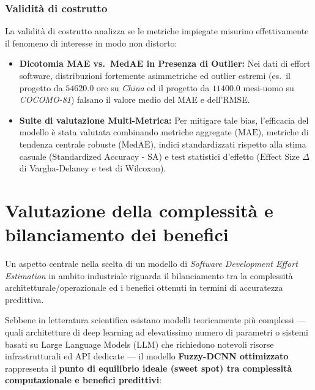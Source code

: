 \documentclass[11pt, a4paper]{article}
\begin{document}
\subsubsection{Validità di costrutto}
La validità di costrutto analizza se le metriche impiegate misurino effettivamente il fenomeno di interesse in modo non distorto:
\begin{itemize}
    \item \textbf{Dicotomia MAE vs.\ MedAE in Presenza di Outlier:} Nei dati di effort software, distribuzioni fortemente asimmetriche ed outlier estremi (es.\ il progetto da $54620.0$ ore su \textit{China} ed il progetto da $11400.0$ mesi-uomo su \textit{COCOMO-81}) falsano il valore medio del MAE e dell'RMSE.
    \item \textbf{Suite di valutazione Multi-Metrica:} Per mitigare tale bias, l'efficacia del modello è stata valutata combinando metriche aggregate ($\text{MAE}$), metriche di tendenza centrale robuste ($\text{MedAE}$), indici standardizzati rispetto alla stima casuale ($\text{Standardized Accuracy - SA}$) e test statistici d'effetto ($\text{Effect Size } \Delta$ di Vargha-Delaney e test di Wilcoxon).
\end{itemize}

\section{Valutazione della complessità e bilanciamento dei benefici}\label{sec:complessita}
Un aspetto centrale nella scelta di un modello di \textit{Software Development Effort Estimation} in ambito industriale riguarda il bilanciamento tra la complessità architetturale/operazionale ed i benefici ottenuti in termini di accuratezza predittiva.

Sebbene in letteratura scientifica esistano modelli teoricamente più complessi
--- quali architetture di deep learning ad elevatissimo numero di parametri o
sistemi basati su Large Language Models (LLM) che richiedono notevoli risorse
infrastrutturali ed API dedicate --- il modello \textbf{Fuzzy-DCNN ottimizzato}
rappresenta il \textbf{punto di equilibrio ideale (sweet spot) tra complessità
    computazionale e benefici predittivi}:
\end{document}
